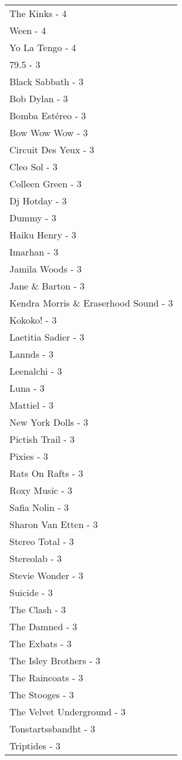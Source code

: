 \documentclass[
]{article}
\begin{document}
\begin{longtable}{l}
The Kinks - 4 \\ 
Ween - 4 \\ 
Yo La Tengo - 4 \\ 
79.5 - 3 \\ 
Black Sabbath - 3 \\ 
Bob Dylan - 3 \\ 
Bomba Estéreo - 3 \\ 
Bow Wow Wow - 3 \\ 
Circuit Des Yeux - 3 \\ 
Cleo Sol - 3 \\ 
Colleen Green - 3 \\ 
Dj Hotday - 3 \\ 
Dummy - 3 \\ 
Haiku Henry - 3 \\ 
Imarhan - 3 \\ 
Jamila Woods - 3 \\ 
Jane \& Barton - 3 \\ 
Kendra Morris \& Eraserhood Sound - 3 \\ 
Kokoko! - 3 \\ 
Laetitia Sadier - 3 \\ 
Lannds - 3 \\ 
Leenalchi - 3 \\ 
Luna - 3 \\ 
Mattiel - 3 \\ 
New York Dolls - 3 \\ 
Pictish Trail - 3 \\ 
Pixies - 3 \\ 
Rats On Rafts - 3 \\ 
Roxy Music - 3 \\ 
Safia Nolin - 3 \\ 
Sharon Van Etten - 3 \\ 
Stereo Total - 3 \\ 
Stereolab - 3 \\ 
Stevie Wonder - 3 \\ 
Suicide - 3 \\ 
The Clash - 3 \\ 
The Damned - 3 \\ 
The Exbats - 3 \\ 
The Isley Brothers - 3 \\ 
The Raincoats - 3 \\ 
The Stooges - 3 \\ 
The Velvet Underground - 3 \\ 
Tonstartssbandht - 3 \\ 
Triptides - 3 \\ 

\end{longtable}
\end{document}
